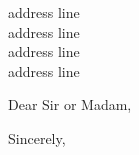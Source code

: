 \documentclass[a4paper]{letter}
\begin{document}
\begin{letter}{\small
address line \\
address line \\
address line\\
address line}


\opening{Dear Sir or Madam,}

\setlength{\headsep}{100pt}

\lipsum[1-6]  %
 
{\raggedleft\closing{\raggedleft Sincerely,}}

\end{letter}
\end{document}
